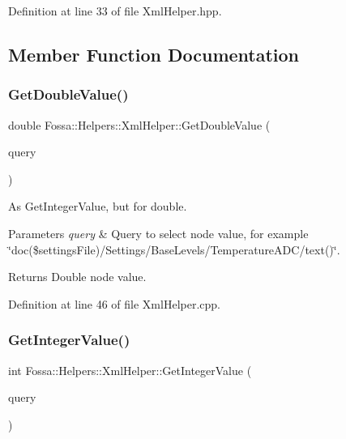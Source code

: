 Definition at line 33 of file Xml\+Helper.\+hpp.



\subsection{Member Function Documentation}
\mbox{\label{class_fossa_1_1_helpers_1_1_xml_helper_aa079061f79b80c958c5f21c3e0b02252}} 
\subsubsection{\texorpdfstring{Get\+Double\+Value()}{GetDoubleValue()}}
{\footnotesize\ttfamily double Fossa\+::\+Helpers\+::\+Xml\+Helper\+::\+Get\+Double\+Value (\begin{DoxyParamCaption}\item[{const Q\+Xml\+Query $\ast$}]{query }\end{DoxyParamCaption})\hspace{0.3cm}{\ttfamily [static]}}



As Get\+Integer\+Value, but for double. 


\begin{DoxyParams}{Parameters}
{\em query} & Query to select node value, for example \char`\"{}doc(\$settings\+File)/\+Settings/\+Base\+Levels/\+Temperature\+A\+D\+C/text()\char`\"{}. \\
\hline
\end{DoxyParams}
\begin{DoxyReturn}{Returns}
Double node value. 
\end{DoxyReturn}


Definition at line 46 of file Xml\+Helper.\+cpp.

\mbox{\label{class_fossa_1_1_helpers_1_1_xml_helper_a7bc8a5dd4d5ab503f274c3bb9a559f84}} 
\subsubsection{\texorpdfstring{Get\+Integer\+Value()}{GetIntegerValue()}}
{\footnotesize\ttfamily int Fossa\+::\+Helpers\+::\+Xml\+Helper\+::\+Get\+Integer\+Value (\begin{DoxyParamCaption}\item[{const Q\+Xml\+Query $\ast$}]{query }\end{DoxyParamCaption})\hspace{0.3cm}{\ttfamily [static]}}



